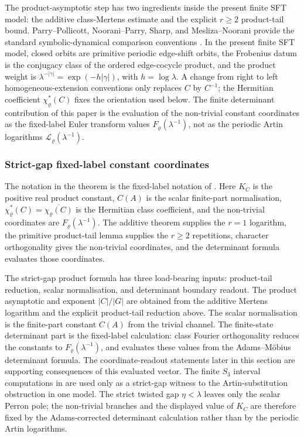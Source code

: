 The product-asymptotic step has two ingredients inside the present finite SFT model:
the additive class-Mertens estimate and the explicit \(r\ge2\) product-tail
bound.  Parry--Pollicott, Noorani--Parry, Sharp, and Mesliza--Noorani provide
the standard symbolic-dynamical comparison conventions
\cite{ParryPollicott1986Chebotarev,NooraniParry1992ChebotarevShifts,Sharp1991Mertens,MeslizaNoorani1999FrobeniusMertens}.
In the present finite SFT model, closed orbits are primitive periodic edge-shift
orbits, the Frobenius datum is the conjugacy class of the ordered edge-cocycle
product, and the product weight is
\(\lambda^{-|\gamma|}=\exp(-h|\gamma|)\), with \(h=\log\lambda\).  A change from
right to left homogeneous-extension conventions only replaces \(C\) by
\(C^{-1}\); the Hermitian coefficient \(\chi_\varrho^\ast(C)\) fixes the
orientation used below.  The finite determinant contribution of this paper is
the evaluation of the non-trivial constant coordinates as the fixed-label Euler
transform values \(F_\varrho(\lambda^{-1})\), not as the periodic Artin
logarithms \(\mathcal L_\varrho(\lambda^{-1})\).

\subsubsection{Strict-gap fixed-label constant coordinates}
\label{subsubsec:main-iii-fixed-label-products}

The notation in the theorem is the fixed-label notation of
.  Here \(K_C\) is the positive
real product constant, \(C(A)\) is the scalar finite-part normalisation,
\(\chi_\varrho^\ast(C)=\overline{\chi_\varrho(C)}\) is the Hermitian class
coefficient, and the non-trivial coordinates are
\(F_\varrho(\lambda^{-1})\).  The additive theorem supplies the \(r=1\)
logarithm, the primitive product-tail lemma supplies the \(r\ge2\)
repetitions, character orthogonality gives the non-trivial coordinates, and the
determinant formula evaluates those coordinates.

The strict-gap product formula has three load-bearing inputs: product-tail
reduction, scalar normalisation, and determinant boundary readout.  The product asymptotic and
exponent \(|C|/|G|\) are obtained from the additive Mertens logarithm and the
explicit product-tail reduction above.  The scalar normalisation is the
finite-part constant \(C(A)\) from the trivial channel.  The finite-state
determinant part is the fixed-label calculation: class Fourier orthogonality
reduces the constants to \(F_\varrho(\lambda^{-1})\), and
 evaluates these values from the
Adams--M\"obius determinant formula.  The coordinate-readout statements later
in this section are supporting consequences of this evaluated vector.  The
finite \(S_3\) interval computations in
 are used only as a strict-gap witness to
the Artin-substitution obstruction in one model.  The strict twisted gap
\(\eta<\lambda\) leaves only the scalar Perron pole; the non-trivial branches
and the displayed value of \(K_C\) are therefore fixed by the Adams-corrected
determinant calculation rather than by the periodic Artin logarithms.

